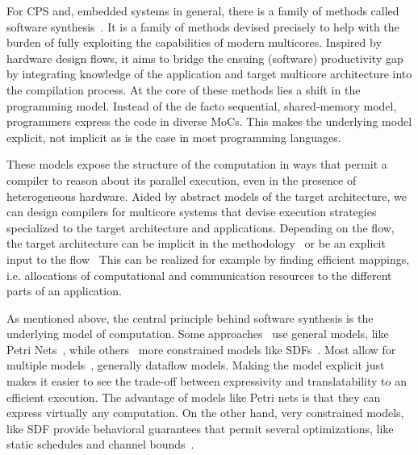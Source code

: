 For \ac{CPS} and, embedded systems in general, there is a family of methods called software synthesis~\cite{ritz1992softwaresynthesis,abbott1993softwaresynthesis,lin1998softwaresynthesis,bhartacharyya2000softwaresynthesis,pino1995softwaresynthesis,castrillon2011trends,bhattacharyya2012softwaresynthesis}.
It is a family of methods devised precisely to help with the burden of fully exploiting the capabilities of modern multicores.
Inspired by hardware design flows, it aims to bridge the ensuing (software) productivity gap by integrating knowledge of the application and target multicore architecture into the compilation process.
At the core of these methods lies a shift in the programming model.
Instead of the de facto sequential, shared-memory model, programmers express the code in diverse \acp{MoC}.
This makes the underlying model explicit, not implicit as is the case in most programming languages.

These models expose the structure of the computation in ways that permit a compiler to reason about its parallel execution, even in the presence of heterogeneous hardware.
Aided by abstract models of the target architecture, we can design compilers for multicore systems that devise execution strategies specialized to the target architecture and applications.
Depending on the flow, the target architecture can be implicit in the methodology~\cite{ritz1992softwaresynthesis} or be an explicit input to the flow~\cite{maps}
This can be realized for example by finding efficient mappings, i.e. allocations of computational and communication resources to the different parts of an application.

As mentioned above, the central principle behind software synthesis is the underlying model of computation. 
Some approaches~\cite{lin1998softwaresynthesis} use general models, like Petri Nets~\cite{petri1962nets}, while others~\cite{ritz1992softwaresynthesis} more constrained models like \acp{SDF}~\cite{lee1987sdf}.
Most allow for multiple models~\cite{bhartacharyya2000softwaresynthesis,pino1995softwaresynthesis,bhattacharyya2012softwaresynthesis}, generally dataflow models.
Making the model explicit just makes it easier to see the trade-off between expressivity and translatability to an efficient execution.
The advantage of models like Petri nets is that they can express virtually any computation.
On the other hand, very constrained models, like \ac{SDF} provide behavioral guarantees that permit several optimizations, like static schedules and channel bounds~\cite{Parks:M95/105}.


